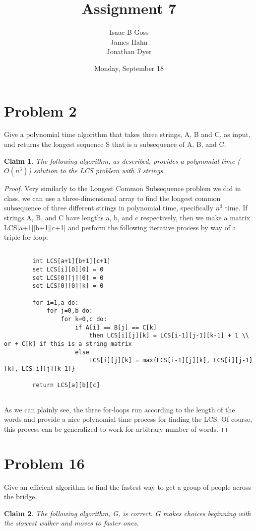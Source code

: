 \documentclass{article}
\author{Isaac B Goss\\ James Hahn\\ Jonathan Dyer}
\title{Assignment 7}
\date{Monday, September 18}
\newtheorem{thm}{Claim}
\providecommand{\prob}[1]{\section*{Problem #1}}
\begin{document}
\maketitle

\prob{2}
Give a polynomial time algorithm that takes three strings, A, B and C, as input, and returns the longest sequence S that is a subsequence of A, B, and C.

\begin{thm}
The following algorithm, as described, provides a polynomial time ($O(n^3)$) solution to the LCS problem with 3 strings.
\end{thm}

\begin{proof}
    Very similarly to the Longest Common Subsequence problem we did in class, we can use a three-dimensional array to find the longest common subsequence of three different strings in polynomial time, specifically $n^3$ time. If strings A, B, and C have lengths a, b, and c respectively, then we make a matrix LCS[a+1][b+1][c+1] and perform the following iterative process by way of a triple for-loop:
    
    \begin{lstlisting}

        int LCS[a+1][b+1][c+1]
        set LCS[i][0][0] = 0
        set LCS[0][j][0] = 0
        set LCS[0][0][k] = 0
        
        for i=1,a do:
            for j=0,b do:
                for k=0,c do:
                    if A[i] == B[j] == C[k]
                        then LCS[i][j][k] = LCS[i-1][j-1][k-1] + 1 \\ or + C[k] if this is a string matrix
                    else
                        LCS[i][j][k] = max{LCS[i-1][j][k], LCS[i][j-1][k], LCS[i][j][k-1]}
                    
        return LCS[a][b][c]
        
    \end{lstlisting}
    
    As we can plainly see, the three for-loops run according to the length of the words and provide a nice polynomial time process for finding the LCS. Of course, this process can be generalized to work for arbitrary number of words.

\end{proof}

\prob{16}
Give an efficient algorithm to find the fastest way to get a group of people across the bridge.

\begin{thm}
	The following algorithm, G, is correct.  G makes choices beginning with the slowest walker and moves to faster ones.
\end{thm}
\end{document}
